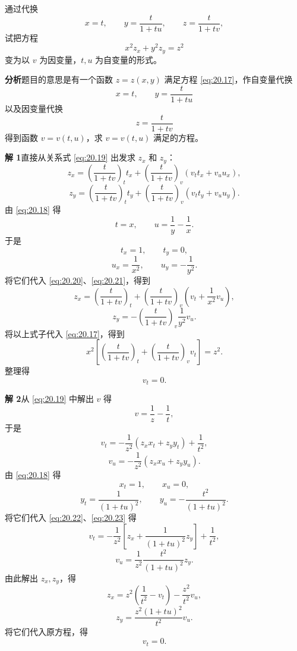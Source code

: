 \begin{xexample}[20.3.3]
通过代换
\[
  x=t,\qquad y=\frac{t}{1+tu},\qquad z=\frac{t}{1+tv},
\]
试把方程
\begin{equation}
  x^2z_x+y^2z_y=z^2
  \tag{20.17}
  \label{eq:20.17}
\end{equation}
变为以 $v$ 为因变量，$t,u$ 为自变量的形式。
\end{xexample}
\begin{xsolution}
\textbf{分析}\quad 题目的意思是有一个函数 $z=z(x,y)$ 满足方程 \eqref{eq:20.17}，作自变量代换
\begin{equation}
  x=t,\qquad y=\frac{t}{1+tu}
  \tag{20.18}
  \label{eq:20.18}
\end{equation}
以及因变量代换
\begin{equation}
  z=\frac{t}{1+tv}
  \tag{20.19}
  \label{eq:20.19}
\end{equation}
得到函数 $v=v(t,u)$，求 $v=v(t,u)$ 满足的方程。

\textbf{解 1}\quad 直接从关系式 \eqref{eq:20.19} 出发求 $z_x$ 和 $z_y$：
\begin{equation}
  z_x=\left(\frac{t}{1+tv}\right)_t t_x
  +\left(\frac{t}{1+tv}\right)_v(v_tt_x+v_uu_x),
  \tag{20.20}
  \label{eq:20.20}
\end{equation}
\begin{equation}
  z_y=\left(\frac{t}{1+tv}\right)_t t_y
  +\left(\frac{t}{1+tv}\right)_v(v_tt_y+v_uu_y).
  \tag{20.21}
  \label{eq:20.21}
\end{equation}
由 \eqref{eq:20.18} 得
\[
  t=x,\qquad u=\frac1y-\frac1x.
\]
于是
\[
  t_x=1,\qquad t_y=0,
\]
\[
  u_x=\frac1{x^2},\qquad u_y=-\frac1{y^2}.
\]
将它们代入 \eqref{eq:20.20}、\eqref{eq:20.21}，得到
\[
  z_x=\left(\frac{t}{1+tv}\right)_t
  +\left(\frac{t}{1+tv}\right)_v
  \left(v_t+\frac1{x^2}v_u\right),
\]
\[
  z_y=-\left(\frac{t}{1+tv}\right)_v\frac1{y^2}v_u.
\]
将以上式子代入 \eqref{eq:20.17}，得到
\[
  x^2\left[\left(\frac{t}{1+tv}\right)_t
  +\left(\frac{t}{1+tv}\right)_vv_t\right]=z^2.
\]
整理得
\[
  v_t=0.
\]

\textbf{解 2}\quad 从 \eqref{eq:20.19} 中解出 $v$ 得
\[
  v=\frac1z-\frac1t,
\]
于是
\begin{equation}
  v_t=-\frac1{z^2}(z_xx_t+z_yy_t)+\frac1{t^2},
  \tag{20.22}
  \label{eq:20.22}
\end{equation}
\begin{equation}
  v_u=-\frac1{z^2}(z_xx_u+z_yy_u).
  \tag{20.23}
  \label{eq:20.23}
\end{equation}
由 \eqref{eq:20.18} 得
\[
  x_t=1,\qquad x_u=0,
\]
\[
  y_t=\frac1{(1+tu)^2},\qquad
  y_u=-\frac{t^2}{(1+tu)^2}.
\]
将它们代入 \eqref{eq:20.22}、\eqref{eq:20.23} 得
\[
  v_t=-\frac1{z^2}\left[z_x+\frac1{(1+tu)^2}z_y\right]+\frac1{t^2},
\]
\[
  v_u=\frac1{z^2}\frac{t^2}{(1+tu)^2}z_y.
\]
由此解出 $z_x,z_y$，得
\[
  z_x=z^2\left(\frac1{t^2}-v_t\right)-\frac{z^2}{t^2}v_u,
\]
\[
  z_y=\frac{z^2(1+tu)^2}{t^2}v_u.
\]
将它们代入原方程，得
\[
  v_t=0.
\]
\end{xsolution}


